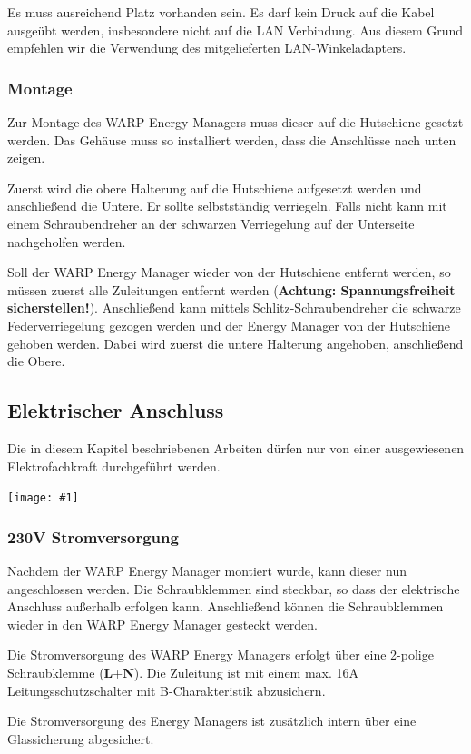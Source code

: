 \documentclass[a4paper,10pt]{article}
\newcommand{\hint}[1]{\begin{tcolorbox}[colback=boxgray,colframe=black,coltext=
white,title=Hinweis,left*=2mm,right*=2mm,boxsep=1mm,bottom=1mm,top=1mm]#1\end{tcolorbox}}
\newcommand{\gfx}[1]{\texttt{[image: \#1]}}
\begin{document}
\begin{multicols*}{2}
	Es muss ausreichend Platz vorhanden sein. Es darf kein Druck auf die Kabel
	ausgeübt werden, insbesondere nicht auf die LAN Verbindung. Aus diesem Grund
	empfehlen wir die Verwendung des mitgelieferten LAN-Winkeladapters.

	\subsubsection{Montage}
	Zur Montage des WARP Energy Managers muss dieser auf die Hutschiene
	gesetzt werden. Das Gehäuse muss so installiert werden, dass die Anschlüsse
	nach unten zeigen.

	Zuerst wird die obere Halterung auf die Hutschiene aufgesetzt werden und anschließend
	die Untere. Er sollte selbstständig verriegeln. Falls nicht kann mit einem
	Schraubendreher an der schwarzen Verriegelung auf der Unterseite
	nachgeholfen werden.
	\par
	Soll der WARP Energy Manager wieder von der Hutschiene entfernt werden, so
	müssen zuerst alle Zuleitungen entfernt werden (\textbf{Achtung: Spannungsfreiheit
	sicherstellen!}). Anschließend kann mittels Schlitz-Schraubendreher die schwarze
	Federverriegelung gezogen werden und der Energy Manager von der Hutschiene
	gehoben werden. Dabei wird zuerst die untere Halterung angehoben,
	anschließend die Obere.
	\newpage
	\subsection{Elektrischer Anschluss}
	\hint{Die in diesem Kapitel beschriebenen Arbeiten dürfen nur von einer ausgewiesenen
		Elektrofachkraft durchgeführt werden.}

	\gfx{./img/wem_connections.jpg}


	\subsubsection{230V Stromversorgung}
	Nachdem der WARP Energy Manager montiert wurde, kann dieser nun angeschlossen werden.
	Die Schraubklemmen sind steckbar, so dass der elektrische Anschluss
	außerhalb erfolgen kann. Anschließend können die Schraubklemmen wieder in
	den WARP Energy Manager gesteckt werden.

	Die Stromversorgung des WARP Energy Managers erfolgt über eine 2-polige
	Schraubklemme (\textbf{L}+\textbf{N}). Die Zuleitung ist mit einem max. 16A Leitungsschutzschalter mit
	B-Charakteristik abzusichern.

	Die Stromversorgung des Energy Managers ist zusätzlich intern über eine Glassicherung 
	abgesichert.


\end{multicols*}
\end{document}
